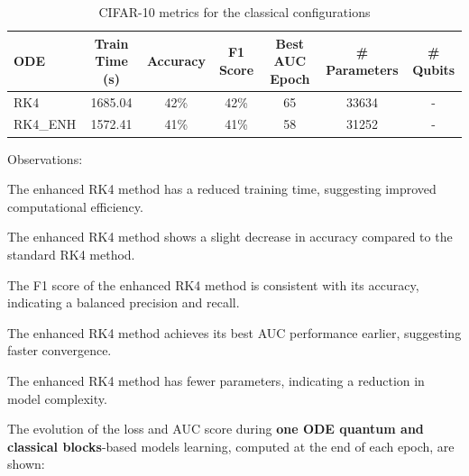 \documentclass[12pt,a4paper]{report}
\begin{document}
\clearpage

\begin{table}[th]\small\linespread{1}
  \label{tab:classical_CIFAR_2}
  \centering
  \begin{tabular}{|l|c|c|c|c|c|c|}
    \hline
    \textbf{ODE} & \textbf{Train Time (s)} & \textbf{Accuracy} & \textbf{F1 Score} & \textbf{Best AUC Epoch} & \textbf{\# Parameters} & \textbf{\# Qubits} \\
    \hline
    RK4          & 1685.04                 & 42\%              & 42\%              & 65                      & 33634                  & -                  \\
    RK4\_ENH     & 1572.41                 & 41\%              & 41\%              & 58                      & 31252                  & -                  \\
    \hline
  \end{tabular}
  \caption{CIFAR-10 metrics for the classical configurations}
\end{table}

Observations:

The enhanced RK4 method has a reduced training time, suggesting improved computational efficiency.

The enhanced RK4 method shows a slight decrease in accuracy compared to the standard RK4 method.

The F1 score of the enhanced RK4 method is consistent with its accuracy, indicating a balanced precision and recall.

The enhanced RK4 method achieves its best AUC performance earlier, suggesting faster convergence.

The enhanced RK4 method has fewer parameters, indicating a reduction in model complexity.

\clearpage
The evolution of the loss and AUC score during \textbf{one ODE quantum and classical blocks}-based models learning, computed at the end of each epoch, are shown:
\end{document}
